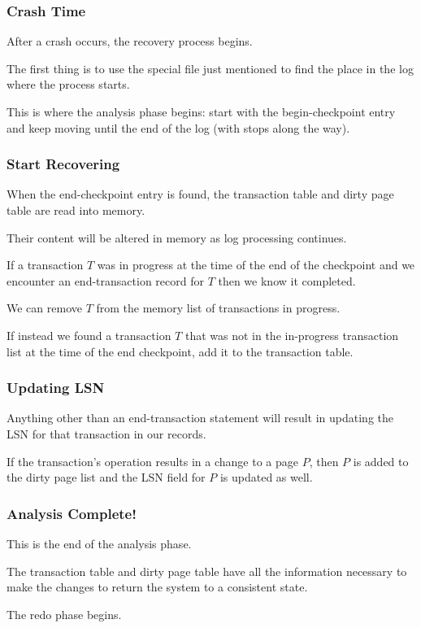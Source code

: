 \begin{frame}
\frametitle{Crash Time}

After a crash occurs, the recovery process begins. 

The first thing is to use the special file just mentioned to find the place in the log where the process starts. 

This is where the analysis phase begins: start with the begin-checkpoint entry and keep moving until the end of the log (with stops along the way). 

\end{frame}

\begin{frame}
\frametitle{Start Recovering}

When the end-checkpoint entry is found, the transaction table and dirty page table are read into memory. 

Their content will be altered in memory as log processing continues. 

If a transaction $T$ was in progress at the time of the end of the checkpoint and we encounter an end-transaction record for $T$ then we know it completed.

We can remove $T$ from the memory list of transactions in progress. 

If instead we found a transaction $T$ that was not in the in-progress transaction list at the time of the end checkpoint, add it to the transaction table. 

\end{frame}

\begin{frame}
\frametitle{Updating LSN}

Anything other than an end-transaction statement will result in updating the LSN for that transaction in our records. 

If the transaction's operation results in a change to a page $P$, then $P$ is added to the dirty page list and the LSN field for $P$ is updated as well. 

\end{frame}

\begin{frame}
\frametitle{Analysis Complete!}

This is the end of the analysis phase.

The transaction table and dirty page table have all the information necessary to make the changes to return the system to a consistent state.

The redo phase begins.

\end{frame}


